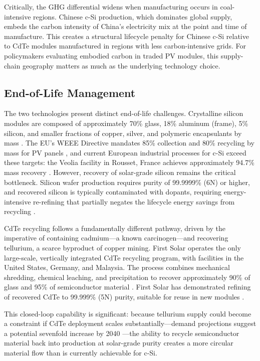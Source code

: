 \documentclass{article}
\begin{document}
Critically, the GHG differential widens when manufacturing occurs in coal-intensive regions. Chinese c-Si production, which dominates global supply, embeds the carbon intensity of China's electricity mix at the point and time of manufacture. This creates a structural lifecycle penalty for Chinese c-Si relative to CdTe modules manufactured in regions with less carbon-intensive grids. For policymakers evaluating embodied carbon in traded PV modules, this supply-chain geography matters as much as the underlying technology choice.
 
\subsection{End-of-Life Management}
 
The two technologies present distinct end-of-life challenges. Crystalline silicon modules are composed of approximately 70\% glass, 18\% aluminum (frame), 5\% silicon, and smaller fractions of copper, silver, and polymeric encapsulants by mass \citep{recyclingreview2024}. The EU's WEEE Directive mandates 85\% collection and 80\% recycling by mass for PV panels \citep{weee2012}, and current European industrial processes for c-Si exceed these targets: the Veolia facility in Rousset, France achieves approximately 94.7\% mass recovery \citep{pvcycle2020}. However, recovery of solar-grade silicon remains the critical bottleneck. Silicon wafer production requires purity of 99.9999\% (6N) or higher, and recovered silicon is typically contaminated with dopants, requiring energy-intensive re-refining that partially negates the lifecycle energy savings from recycling \citep{cas2024}.
 
CdTe recycling follows a fundamentally different pathway, driven by the imperative of containing cadmium---a known carcinogen---and recovering tellurium, a scarce byproduct of copper mining. First Solar operates the only large-scale, vertically integrated CdTe recycling program, with facilities in the United States, Germany, and Malaysia. The process combines mechanical shredding, chemical leaching, and precipitation to recover approximately 90\% of glass and 95\% of semiconductor material \citep{sinha2012, firstsolar2024sustainability}. First Solar has demonstrated refining of recovered CdTe to 99.999\% (5N) purity, suitable for reuse in new modules \citep{firstsolarreview2015}. 

This closed-loop capability is significant: because tellurium supply could become a constraint if CdTe deployment scales substantially---demand projections suggest a potential sevenfold increase by 2040 \citep{CdTewaste2024}---the ability to recycle semiconductor material back into production at solar-grade purity creates a more circular material flow than is currently achievable for c-Si.
 
\end{document}
